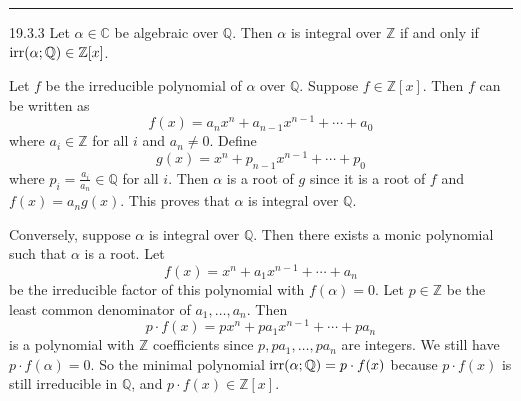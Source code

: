 \documentclass[letterpaper, 12pt]{article}
\begin{document}
\noindent\rule{7in}{2.8pt}
\begin{problem}{19.3.3}
Let \(\alpha \in \mathbb{C}\) be algebraic over \(\mathbb{Q}\). Then \(\alpha\) is integral over \(\mathbb{Z}\) if and only if \(\text{irr}(\alpha;\mathbb{Q})\in \mathbb{Z}[x]\).
\end{problem}
\begin{solution}
Let \(f\) be the irreducible polynomial of \(\alpha\) over \(\mathbb{Q}\). Suppose \(f\in \mathbb{Z}[x]\). Then \(f\) can be written as 
\[f(x)=a_nx^n+a_{n-1}x^{n-1}+\cdots+a_0\]
where \(a_i\in \mathbb{Z}\) for all \(i\) and \(a_n\neq 0\). Define 
\[g(x)=x^n+p_{n-1}x^{n-1}+\cdots+p_0\]
where \(p_i=\frac{a_i}{a_n}\in \mathbb{Q}\) for all \(i\). Then \(\alpha\) is a root of \(g\) since it is a root of \(f\) and \(f(x)=a_n g(x)\). This proves that \(\alpha\) is integral over \(\mathbb{Q}\). 

Conversely, suppose \(\alpha\) is integral over \(\mathbb{Q}\). Then there exists a monic polynomial 
such that \(\alpha\) is a root. Let 
\[f(x)=x^n+a_1x^{n-1}+\cdots+a_n\] 
be the irreducible factor of this polynomial with \(f(\alpha)=0\). Let \(p\in \mathbb{Z}\) be the least common denominator of \(a_1,\ldots,a_n\). Then 
\[p\cdot f(x)=px^n+pa_1x^{n-1}+\cdots+pa_n\]
is a polynomial with \(\mathbb{Z}\) coefficients since \(p,pa_1,\ldots,pa_n\) are integers. We still have \(p\cdot f(\alpha)=0\). So the minimal polynomial \(\text{irr}(\alpha;\mathbb{Q})=p\cdot f(x)\) because \(p\cdot f(x)\) is still irreducible in \(\mathbb{Q}\), and \(p\cdot f(x)\in \mathbb{Z}[x]\).
\end{solution}
\end{document}
